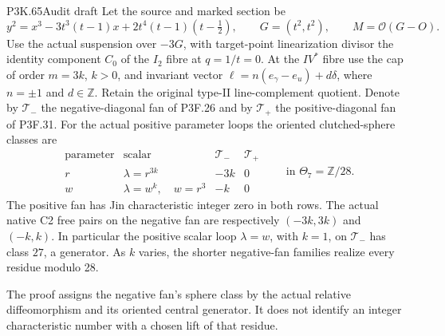 \begin{statement}{P3K.65}{Audit draft}
Let the source and marked section be
\[
 y^2=x^3-3t^3(t-1)x+2t^4(t-1)(t-\tfrac12),\qquad
 G=(t^2,t^2),\qquad M=\mathcal O(G-O).
\]
Use the actual suspension over \(-3G\), with target-point
linearization divisor the identity component \(C_0\) of the
\(I_2\) fibre at \(q=1/t=0\). At the \(IV^*\) fibre use the
cap of order \(m=3k\), \(k>0\), and invariant vector
\(\ell=n(e_\gamma-e_u)+d\delta\), where \(n=\pm1\) and
\(d\in\mathbb Z\). Retain the original type-II line-complement
quotient. Denote by \(\mathcal T_-\) the negative-diagonal fan
of P3F.26 and by \(\mathcal T_+\) the positive-diagonal fan of
P3F.31. For the actual positive parameter loops the oriented
clutched-sphere classes are
\[
\begin{array}{c|c|c|c}
 \text{parameter}&\text{scalar}&\mathcal T_-&\mathcal T_+\\ \hline
 r&\lambda=r^{3k}&-3k&0\\
 w&\lambda=w^k,\quad w=r^3&-k&0
\end{array}\qquad\text{in }\Theta_7=\mathbb Z/28.       \tag{P3K.65.OR.1}
\]
The positive fan has Jin characteristic integer zero in both rows.
The actual native C2 free pairs on the negative fan are respectively
\((-3k,3k)\) and \((-k,k)\). In particular the positive scalar
loop \(\lambda=w\), with \(k=1\), on \(\mathcal T_-\) has class
\(27\), a generator. As \(k\) varies, the shorter negative-fan
families realize every residue modulo 28.

The proof assigns the negative fan's sphere class by the actual
relative diffeomorphism and its oriented central generator. It does
not identify an integer characteristic number with a chosen lift of
that residue.
\end{statement}

